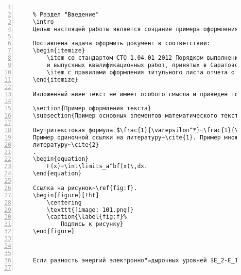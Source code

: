 \documentclass[bachelor, och, pract]{SCWorks}
\begin{document}
\begin{Verbatim}[fontsize=\small, numbers=left]
	
	% Раздел "Введение"
	\intro
	Целью настоящей работы является создание примера оформления студенческой работы средствами системы \LaTeX.
	
	Поставлена задача оформить документ в соответствии:
	\begin{itemize}
		\item со стандартом СТО 1.04.01-2012 Порядком выполнения, структурой и правилами оформления курсовых работ (проектов)
		и выпускных квалификационных работ, принятых в Саратовском государственном университете в 2012 году;
		\item с правилами оформления титульного листа отчета о прохождении практики в соответствии со стандартом СТО 1.01-2005.
	\end{itemize}
	
	Изложенный ниже текст не имеет особого смысла и приведен только для демонстрации оформления своих элементов.
	
	\section{Пример оформления текста}
	\subsection{Пример основных элементов математического текста}
	
	Внутритекстовая формула $\frac{1}{\varepsilon^*}=\frac{1}{\varepsilon_\infty}-\frac{1}{\varepsilon_0}$.
	Пример одиночной ссылки на литературу~\cite{1}. Пример множественной ссылки на
	литературу~\cite{2}
	.
	\begin{equation}
		F(x)=\int\limits_a^bf(x)\,dx.
	\end{equation}
	
	Ссылка на рисунок~\ref{fig:f}.
	\begin{figure}[!ht]
		\centering
		\texttt{[image: 101.png]}
		\caption{\label{fig:f}%
			Подпись к рисунку}
	\end{figure}
	
	
	
	Если разность энергий электронно"=дырочных уровней $E_2-E_1$ близка к энергии предельного оптического фонона $\hbar\Omega_{LO}$, то в разложении волновых функций полного гамильтониана можно ограничиться нулевым приближением для всех состояний, за исключением близких по значению к $E_2$. Волновые функции последних представляют собой следующие комбинации почти вырожденных состояний\cite{3}.
	

\end{Verbatim}
\end{document}
